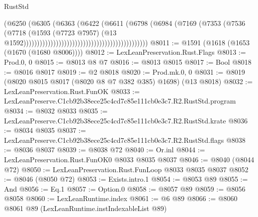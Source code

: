 \begin{lexlean}{RustStd}
\begin{coremodule}
                                                                      (@6250
                                                                        (@6305
                                                                          (@6363
                                                                            (@6422
                                                                              (@6611
                                                                                (@6798
                                                                                  (@6984
                                                                                    (@7169
                                                                                      (@7353
                                                                                        (@7536
                                                                                          (@7718
                                                                                            (@1593
                                                                                              (@7723
                                                                                                @7957)
                                                                                              (@13
                                                                                                @1592))))))))))))))))))))))))))))))))))))))))))))))
@8011 := @1591 (@1618 (@1653 (@1670 (@1680 @8006))))
@8012 := LexLeanPreservation.Rust.Flags
@8013 := Prod.{0, 0}
@8015 := @8013 @8 @7
@8016 := @8013 @8015
@8017 := Bool
@8018 := @8016 @8017
@8019 := @2 @8018
@8020 := Prod.mk.{0, 0}
@8031 := @8019 (@8020 @8015 @8017 (@8020 @8 @7 @382 @385) @1698) (@13 @8018)
@8032 := LexLeanPreservation.Rust.FunOK
@8033 := LexLeanPreserve.C1cb92b38ece25c4cd7c85e111cb0e3c7.R2.RustStd.program
@8034 := @8032 @8033
@8035 := LexLeanPreserve.C1cb92b38ece25c4cd7c85e111cb0e3c7.R2.RustStd.krate
@8036 := @8034 @8035
@8037 := LexLeanPreserve.C1cb92b38ece25c4cd7c85e111cb0e3c7.R2.RustStd.flags
@8038 := @8036 @8037
@8039 := @8038 @72
@8040 := Or.inl
@8044 := LexLeanPreservation.Rust.FunOK0 @8033 @8035 @8037
@8046 := @8040 (@8044 @72)
@8050 := LexLeanPreservation.Rust.FunLoop @8033 @8035 @8037
@8052 := @8046 (@8050 @72)
@8053 := Exists.intro.{1}
@8054 := @8053 @89
@8055 := And
@8056 := Eq.{1}
@8057 := Option.{0}
@8058 := @8057 @89
@8059 := @8056 @8058
@8060 := LexLeanRuntime.index
@8061 := @6 @89
@8066 := @8060 @8061 @89 (LexLeanRuntime.instIndexableList @89)

\end{coremodule}
\end{lexlean}
